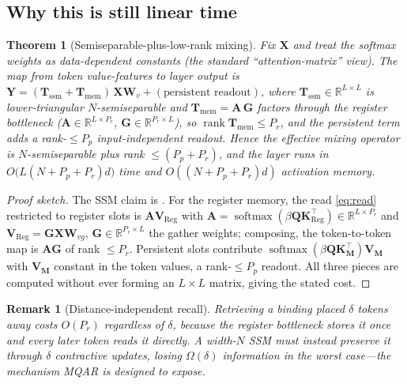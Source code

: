 \documentclass[10pt,journal]{IEEEtran}
\newtheorem{theorem}{Theorem}
\newtheorem{remark}{Remark}
\newcommand{\R}{\mathbb{R}}
\newcommand{\softmax}{\operatorname{softmax}}
\begin{document}
\subsection{Why this is still linear time}
\begin{theorem}[Semiseparable-plus-low-rank mixing]
\label{thm:mix}
Fix $\bm X$ and treat the softmax weights as data-dependent constants (the
standard ``attention-matrix'' view). The map from token value-features to layer
output is $\bm Y=(\bm T_{\mathrm{ssm}}+\bm T_{\mathrm{mem}})\,\bm X\bm W_v+(\text{persistent readout})$,
where $\bm T_{\mathrm{ssm}}\in\R^{L\times L}$ is lower-triangular $N$-semiseparable
and $\bm T_{\mathrm{mem}}=\bm A\,\bm G$ factors through the register bottleneck
($\bm A\in\R^{L\times P_r}$, $\bm G\in\R^{P_r\times L}$), so
$\operatorname{rank}\bm T_{\mathrm{mem}}\le P_r$, and the persistent term adds a
rank-$\le P_p$ input-independent readout. Hence the effective mixing operator is
$N$-semiseparable plus rank $\le(P_p{+}P_r)$, and the layer runs in
$O\!\big(L(N+P_p+P_r)d\big)$ time and $O((N+P_p+P_r)d)$ activation memory.
\end{theorem}
\begin{proof}[Proof sketch]
The SSM claim is \cite{dao2024ssd}. For the register memory, the read
\eqref{eq:read} restricted to register slots is $\bm A\bm V_{\mathrm{Reg}}$ with
$\bm A=\softmax(\beta\bm Q\bm K_{\mathrm{Reg}}^\top)\in\R^{L\times P_r}$ and
$\bm V_{\mathrm{Reg}}=\bm G\bm X\bm W_{vg}$, $\bm G\in\R^{P_r\times L}$ the gather
weights; composing, the token-to-token map is $\bm A\bm G$ of rank $\le P_r$.
Persistent slots contribute $\softmax(\beta\bm Q\bm K_{\bm M}^\top)\bm V_{\bm M}$
with $\bm V_{\bm M}$ constant in the token values, a rank-$\le P_p$ readout. All
three pieces are computed without ever forming an $L\times L$ matrix, giving the
stated cost.
\end{proof}

\begin{remark}[Distance-independent recall]
Retrieving a binding placed $\delta$ tokens away costs $O(P_r)$ regardless of
$\delta$, because the register bottleneck stores it once and every later token
reads it directly. A width-$N$ SSM must instead preserve it through $\delta$
contractive updates, losing $\Omega(\delta)$ information in the worst case---the
mechanism MQAR is designed to expose.
\end{remark}
\end{document}

